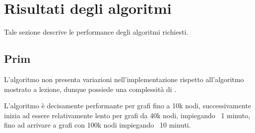\section{Risultati degli algoritmi}
Tale sezione descrive le performance degli algoritmi richiesti.

\subsection{Prim}
L'algoritmo non presenta variazioni nell'implementazione rispetto all'algoritmo mostrato a lezione, dunque possiede una complessità di .

L'algoritmo è decisamente performante per grafi fino a 10k nodi, successivamente inizia ad essere relativamente lento per grafi da 40k nodi, impiegando ~1 minuto, fino ad arrivare a grafi con 100k nodi impiegando ~10 minuti.

